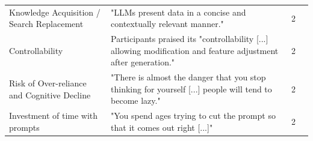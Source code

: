 {\begin{longtable}{>{\raggedright\arraybackslash}p{3.2cm} p{8.8cm}  p{0.2cm} p{1.8cm}}
Knowledge Acquisition / Search Replacement & "LLMs present data in a concise and contextually relevant manner." \cite{Banh:2025cf} & 2 & \cite{Banh:2025cf, Zamfiroiu:2025ec} \\ \addlinespace
Controllability & Participants praised its "controllability [...] allowing modification and feature adjustment after generation." \cite{Zhang:2025ea} & 2 & \cite{Basha:2025tt, Zhang:2025ea} \\ \addlinespace
Risk of Over-reliance and Cognitive Decline & "There is almost the danger that you stop thinking for yourself [...] people will tend to become lazy." \cite{Banh:2025cf} & 2 & \cite{Banh:2025cf, Basha:2025tt} \\ \addlinespace
Investment of time with prompts & "You spend ages trying to cut the prompt so that it comes out right [...]" \cite{Banh:2025cf} & 2 & \cite{Banh:2025cf, Basha:2025tt} \\

\end{longtable}
}


